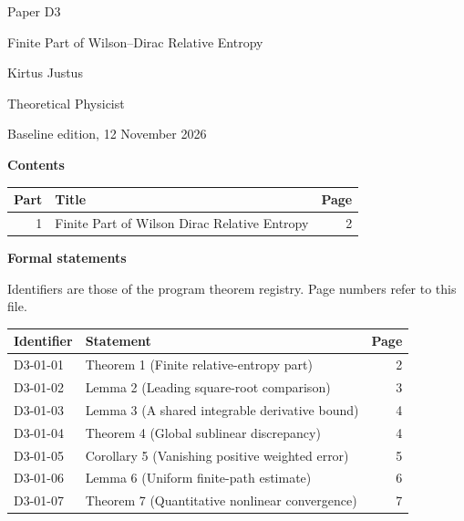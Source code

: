 \documentclass[11pt,a4paper]{article}
\begin{document}
\thispagestyle{empty}\pagestyle{empty}
{\small\sffamily \ProgramTitle\hfill Paper D3\par}
\vspace*{12mm}
{\LARGE\bfseries\raggedright{} Finite Part of Wilson–Dirac Relative Entropy\par}
\vspace{9mm}
{\large Kirtus Justus\par}\vspace{1mm}Theoretical Physicist\par\AuthorLocation\par\vspace{2mm}Baseline edition, 12 November 2026\par\vspace{8mm}
\textbf{Contents}\par\vspace{1mm}
{\small\begin{longtable}{@{}r>{\raggedright\arraybackslash}p{}r@{}}
\toprule Part & Title & Page\\\midrule\endhead
1 & Finite Part of Wilson Dirac Relative Entropy & 2\\
\bottomrule\end{longtable}}
\vspace{2mm}\textbf{Formal statements}\par\vspace{1mm}
{\footnotesize Identifiers are those of the program theorem registry. Page numbers refer to this file.\par}
{\footnotesize\begin{longtable}{@{}l>{\raggedright\arraybackslash}p{}r@{}}
\toprule Identifier & Statement & Page\\\midrule\endhead
D3-01-01 & Theorem 1 (Finite relative-entropy part) & 2\\
D3-01-02 & Lemma 2 (Leading square-root comparison) & 3\\
D3-01-03 & Lemma 3 (A shared integrable derivative bound) & 4\\
D3-01-04 & Theorem 4 (Global sublinear discrepancy) & 4\\
D3-01-05 & Corollary 5 (Vanishing positive weighted error) & 5\\
D3-01-06 & Lemma 6 (Uniform finite-path estimate) & 6\\
D3-01-07 & Theorem 7 (Quantitative nonlinear convergence) & 7\\
\bottomrule\end{longtable}}
\end{document}
